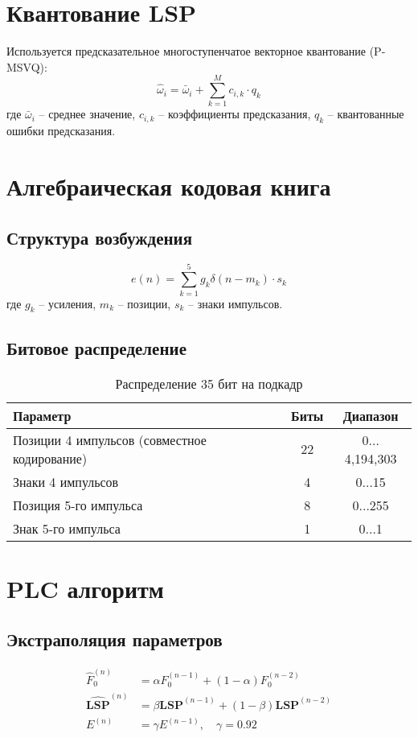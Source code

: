 \documentclass{report}
\begin{document}
	\section{Квантование LSP}
	Используется предсказательное многоступенчатое векторное квантование (P-MSVQ):
	\begin{equation}
		\hat{\omega}_i = \bar{\omega}_i + \sum_{k=1}^{M} c_{i,k} \cdot q_k
	\end{equation}
	где $\bar{\omega}_i$ -- среднее значение, $c_{i,k}$ -- коэффициенты предсказания, $q_k$ -- квантованные ошибки предсказания.
	
	\section{Алгебраическая кодовая книга}
	\subsection{Структура возбуждения}
	\begin{equation}
		e(n) = \sum_{k=1}^{5} g_k \delta(n - m_k) \cdot s_k
	\end{equation}
	где $g_k$ -- усиления, $m_k$ -- позиции, $s_k$ -- знаки импульсов.
	
	\subsection{Битовое распределение}
	\begin{table}[H]
		\centering
		\caption{Распределение 35 бит на подкадр}
		\begin{tabular}{lcc}
			\toprule
			\textbf{Параметр} & \textbf{Биты} & \textbf{Диапазон} \\
			\midrule
			Позиции 4 импульсов (совместное кодирование) & 22 & 0$\ldots$4,194,303 \\
			Знаки 4 импульсов & 4 & 0$\ldots$15 \\
			Позиция 5-го импульса & 8 & 0$\ldots$255 \\
			Знак 5-го импульса & 1 & 0$\ldots$1 \\
			\bottomrule
		\end{tabular}
	\end{table}
	
	\section{PLC алгоритм}
	\subsection{Экстраполяция параметров}
	\begin{align}
		\hat{F}_0^{(n)} &= \alpha F_0^{(n-1)} + (1-\alpha) F_0^{(n-2)} \\
		\hat{\mathbf{LSP}}^{(n)} &= \beta \mathbf{LSP}^{(n-1)} + (1-\beta) \mathbf{LSP}^{(n-2)} \\
		E^{(n)} &= \gamma E^{(n-1)}, \quad \gamma = 0.92
	\end{align}
	
\end{document}

